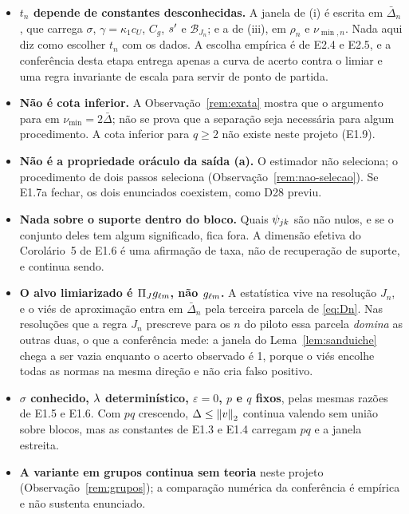 \documentclass[11pt,a4paper]{article}
\newcommand{\eps}{\varepsilon}
\newcommand{\sepmin}{\nu_{\min}}
\newcommand{\sepminn}{\nu_{\min,n}}
\newcommand{\rn}{\rho}
\begin{document}
\begin{itemize}[nosep, leftmargin=*]
  \item \textbf{$t_{n}$ depende de constantes desconhecidas.} A janela de (i)
    é escrita em $\bar{\Delta}_{n}$, que carrega $\sigma$, $\gamma = \kappa_{1}c_{U}$,
    $C_{g}$, $s'$ e $\mathcal{B}_{J_{n}}$; e a de (iii), em $\rn_{n}$ e
    $\sepminn$. Nada aqui diz como escolher $t_{n}$ com os dados. A
    escolha empírica é de E2.4 e E2.5, e a conferência desta etapa entrega
    apenas a curva de acerto contra o limiar e uma regra invariante de escala
    para servir de ponto de partida.
  \item \textbf{Não é cota inferior.} A Observação~\ref{rem:exata} mostra que
    o argumento para em $\sepmin = 2\bar{\Delta}$; não se prova que a separação seja
    necessária para algum procedimento. A cota inferior para $q\ge2$ não
    existe neste projeto (E1.9).
  \item \textbf{Não é a propriedade oráculo da saída (a).} O estimador não
    seleciona; o procedimento de dois passos seleciona
    (Observação~\ref{rem:nao-selecao}). Se E1.7a fechar, os dois enunciados
    coexistem, como D28 previu.
  \item \textbf{Nada sobre o suporte dentro do bloco.} Quais
    $\psi_{jk}$ são não nulos, e se o conjunto deles tem algum
    significado, fica fora. A dimensão efetiva do Corolário~5 de E1.6 é uma
    afirmação de taxa, não de recuperação de suporte, e continua sendo.
  \item \textbf{O alvo limiarizado é $\Pi_{J}g_{\ell m}$, não
    $g_{\ell m}$.} A estatística vive na resolução $J_{n}$, e o viés de
    aproximação entra em $\bar{\Delta}_{n}$ pela terceira parcela de \eqref{eq:Dn}. Nas
    resoluções que a regra $J_{n}$ prescreve para os $n$ do piloto essa
    parcela \emph{domina} as outras duas, o que a conferência mede: a janela
    do Lema~\ref{lem:sanduiche} chega a ser vazia enquanto o acerto observado
    é 1, porque o viés encolhe todas as normas na mesma direção e não cria
    falso positivo.
  \item \textbf{$\sigma$ conhecido, $\lambda$ determinístico, $\eps = 0$,
    $p$ e $q$ fixos}, pelas mesmas razões de E1.5 e E1.6. Com $pq$ crescendo,
    $\Delta \le \left\lVert v \right\rVert_{2}$ continua valendo sem união sobre blocos, mas as
    constantes de E1.3 e E1.4 carregam $pq$ e a janela estreita.
  \item \textbf{A variante em grupos continua sem teoria} neste projeto
    (Observação~\ref{rem:grupos}); a comparação numérica da conferência é
    empírica e não sustenta enunciado.
\end{itemize}
\end{document}
